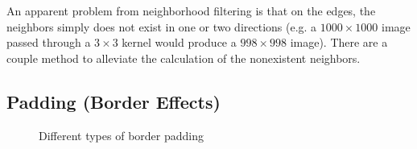 \documentclass[twoside,a4paper,article]{combine}
\begin{document}
An apparent problem from neighborhood filtering is that on the edges, the neighbors simply does not exist in one or two directions 
(e.g. a $1000\times1000$ image passed through a $3\times3$ kernel would produce a $998\times998$ image). 
There are a couple method to alleviate the calculation of the nonexistent neighbors.

\subsection{Padding (Border Effects)}

\begin{minipage}{\textwidth}\begin{figure}[H]
    \centering
    \caption{Different types of border padding}
    \label{fig:padding_borders}
\end{figure}\end{minipage}
\end{document}
